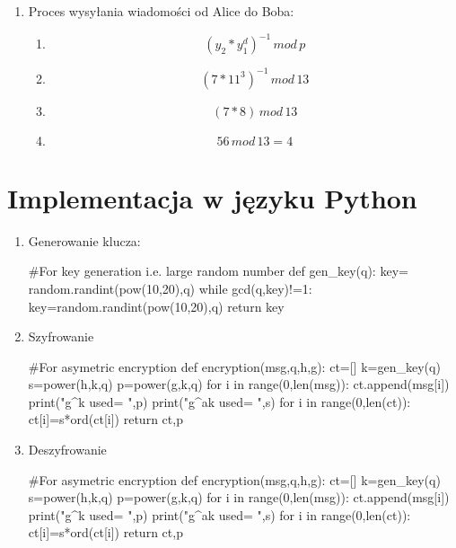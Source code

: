 \documentclass[12pt,a4paper]{article}
\begin{document}
\begin{enumerate}
\begin{enumerate}
\begin{enumerate}
        \end{enumerate}
     \item Proces wysyłania wiadomości od Alice do Boba:
     \begin{enumerate}
         \item \[(y_{2}*y_{1}^{d})^{-1}\,mod\,p\]
         \item \[(7*11^{3})^{-1}\,mod\,13\]
         \item \[(7*8)\,mod\,13\]
         \item \[56\,mod\,13=4\]
     \end{enumerate}
    \end{enumerate}
\end{enumerate}
\section{Implementacja w języku Python}
\begin{enumerate}
    \item Generowanie klucza:\\
    \begin{python}
    #For key generation i.e. large random number
    def gen_key(q):
        key= random.randint(pow(10,20),q)
        while gcd(q,key)!=1:
            key=random.randint(pow(10,20),q)
        return key
    \end{python}
    \item Szyfrowanie\\
    \begin{python}
    #For asymetric encryption
    def encryption(msg,q,h,g):
        ct=[]
        k=gen_key(q)
        s=power(h,k,q)
        p=power(g,k,q)
        for i in range(0,len(msg)):
            ct.append(msg[i])
        print("g^k used= ",p)
        print("g^ak used= ",s)
        for i in range(0,len(ct)):
            ct[i]=s*ord(ct[i])
        return ct,p
    \end{python}
    \item Deszyfrowanie\\
    \begin{python}
    #For asymetric encryption
    def encryption(msg,q,h,g):
        ct=[]
        k=gen_key(q)
        s=power(h,k,q)
        p=power(g,k,q)
        for i in range(0,len(msg)):
            ct.append(msg[i])
        print("g^k used= ",p)
        print("g^ak used= ",s)
        for i in range(0,len(ct)):
            ct[i]=s*ord(ct[i])
        return ct,p
    \end{python}
\end{enumerate}
\end{document}
